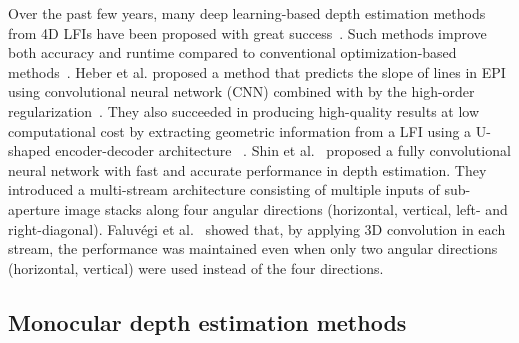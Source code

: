 \documentclass[]{spie}
\newcommand{\jtextd}[1]{}
\begin{document}
Over the past few years, many deep learning-based depth estimation
methods from 4D LFIs have been proposed with great
success~\cite{heber2016convolutional,heber2017neural,shin2018epinet,faluvegi20193d}.
Such methods improve both accuracy and runtime compared to 
conventional optimization-based methods~\cite{tao2013depth,zhang2016robust}.
Heber et al. proposed a method that predicts the slope of lines in
EPI using convolutional neural network (CNN) combined with by the
high-order regularization~\cite{heber2016convolutional}.
They also succeeded in producing high-quality results at low
computational cost by extracting geometric information from a LFI
using a U-shaped encoder-decoder architecture~\cite{heber2017neural} .
Shin et al.~\cite{shin2018epinet} proposed a fully convolutional neural network 
with fast and accurate performance in depth estimation.
They introduced a multi-stream architecture consisting of  multiple inputs
of sub-aperture image stacks along four angular directions (horizontal,
vertical, left- and right-diagonal).
Faluv{\'e}gi et al.~\cite{faluvegi20193d} showed that,
by applying 3D convolution in each stream, the performance was maintained even when only 
two angular directions (horizontal, vertical) were used instead of the four directions.

\subsection{Monocular depth estimation methods}
\jtextd{
   画像認識におけるCNNの成功以来，深層学習に基づく単眼奥行き推定手法が数多く提案されており，
映像を入力とすることで奥行き推定に時系列情報を利用する研究も存在する
   \cite{karsch2014depth,zhou2018unsupervised,zhang2019exploiting}．
Karschら~\cite{karsch2014depth}は，局所的な動作の手がかりとオプティカルフローを用いて，
   時間的に一貫した奥行きマップを生成する手法を提案した．
   Zhouら~\cite{zhou2018unsupervised}は，
   バンドル調整を用いて奥行きとカメラポーズを同時に推定し，超解像ネットワークを
   用いて細部を復元する手法を提案した．
また，Zhangら~\cite{zhang2019exploiting}は，CLSTM
を
   使用して連続した映像フレーム間の空間的特徴と時間的相関を捉える映像奥行き推定フレームワークを提案した．
   具体的には，各映像フレームから
学習済み深層CNNを使用して空間特徴を抽出し，
   CLSTMに入力して時間的相関を集約することで奥行きを推定する．
   この映像奥行き推定フレームワークでは使用する空間特徴抽出ネットワークの種類を問わないため，
他の映像奥行き推定手法にも最小限の変更で適用可能である．
}
\end{document}
